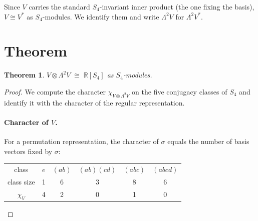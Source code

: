 \documentclass[11pt]{article}
\theoremstyle{plain}
\newtheorem{theorem}{Theorem}
\theoremstyle{remark}
\begin{document}
Since $V$ carries the standard $S_4$-invariant inner product (the one fixing the basis), $V \cong V^*$ as $S_4$-modules. We identify them and write $\Lambda^2 V$ for $\Lambda^2 V^*$.

\section{Theorem}

\begin{theorem}\label{thm:main}
$V \otimes \Lambda^2 V \;\cong\; \mathbb{R}[S_4]$ as $S_4$-modules.
\end{theorem}

\begin{proof}
We compute the character $\chi_{V \otimes \Lambda^2 V}$ on the five conjugacy classes of $S_4$ and identify it with the character of the regular representation.

\paragraph{Character of $V$.}
For a permutation representation, the character of $\sigma$ equals the number of basis vectors fixed by $\sigma$:
\begin{center}
\begin{tabular}{c|ccccc}
class      & $e$ & $(ab)$ & $(ab)(cd)$ & $(abc)$ & $(abcd)$ \\
class size & 1   & 6      & 3          & 8       & 6        \\ \hline
$\chi_V$   & 4   & 2      & 0          & 1       & 0
\end{tabular}
\end{center}


\end{proof}
\end{document}
